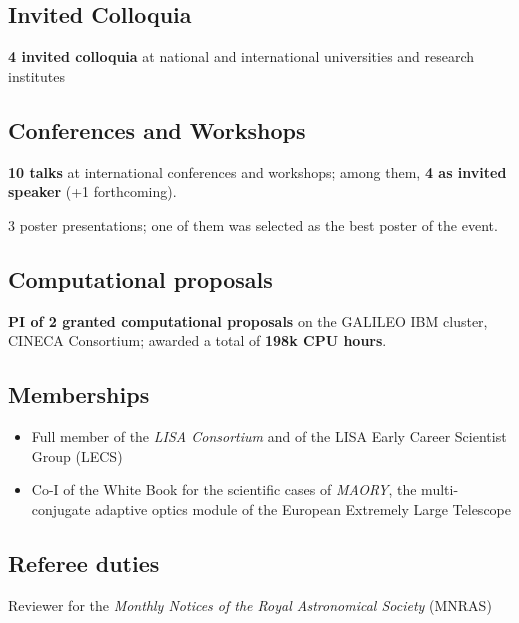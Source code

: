 \documentclass[11pt,a4paper]{article}
\begin{document}
\subsection*{{Invited Colloquia}}
\begin{description}
\setlength\itemsep{-2pt}
\item[\normalfont 2017 -- 2019:] \textbf{4 invited colloquia} at national and international universities and research institutes
\end{description}


\subsection*{Conferences and Workshops}
\begin{description}
\setlength\itemsep{-2pt}
\item \textbf{10 talks} at international conferences and workshops; among them, \textbf{4 as invited speaker} (+1 forthcoming).
\item 3 poster presentations; one of them was selected as the best poster of the event.
\end{description}


\subsection*{{Computational proposals}}
\textbf{PI of 2 granted computational proposals} on the GALILEO IBM cluster, CINECA Consortium; awarded a total of \textbf{198k CPU hours}.

\subsection*{{Memberships}}
\begin{itemize}[leftmargin=3.5mm]
\setlength\itemsep{-2pt}
\item Full member of the \textit{{LISA Consortium}} and of the LISA Early Career Scientist Group (LECS)
\item Co-I of the White Book for the scientific cases of  \textit{MAORY}, the multi-conjugate adaptive optics module of the European Extremely Large Telescope
\end{itemize}



\subsection*{{Referee duties}}
Reviewer for the {\it Monthly Notices of the Royal Astronomical Society} (MNRAS)
\end{document}
